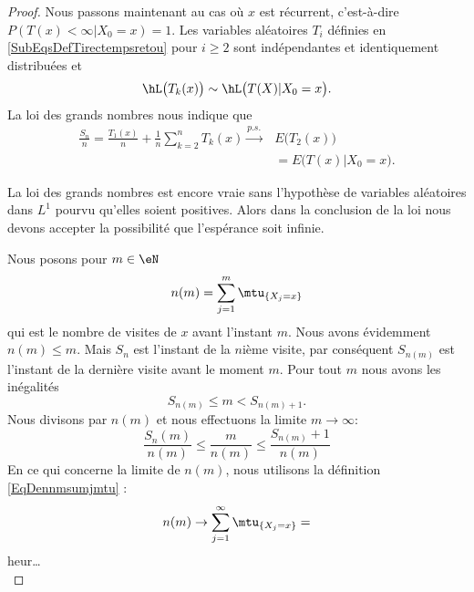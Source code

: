 \begin{proof}
	Nous passons maintenant au cas où \( x\) est récurrent, c'est-à-dire \( P(T(x)<\infty|X_0=x)=1\). Les variables aléatoires \( T_i\) définies en \eqref{SubEqsDefTirectempsretou} pour \( i\geq 2\) sont indépendantes et identiquement distribuées et
	\begin{equation}
		\hL\big( T_k(x) \big)\sim\hL\big( T(X)|X_0=x \big).
	\end{equation}
	La loi des grands nombres nous indique que
	\begin{subequations}        \label{EqlgnMarkdemked}
		\begin{align}
			\frac{ S_n }{ n }=\frac{ T_1(x) }{ n }+\frac{1}{ n }\sum_{k=2}^nT_k(x)\stackrel{p.s.}{\longrightarrow} & E\big( T_2(x) \big)       \\
			                                                                                                       & =E\big( T(x)|X_0=x \big).
		\end{align}
	\end{subequations}
	\begin{remark}
		La loi des grands nombres est encore vraie sans l'hypothèse de variables aléatoires dans \( L^1\) pourvu qu'elles soient positives. Alors dans la conclusion de la loi nous devons accepter la possibilité que l'espérance soit infinie.
	\end{remark}
	Nous posons pour \( m\in\eN\)
	\begin{equation}    \label{EqDennmsumjmtu}
		n(m)=\sum_{j=1}^m\mtu_{\{ X_j=x \}}
	\end{equation}
	qui est le nombre de visites de \( x\) avant l'instant \( m\). Nous avons évidemment \( n(m)\leq m\). Mais \( S_n\) est l'instant de la \( n\)ième visite, par conséquent \( S_{n(m)}\) est l'instant de la dernière visite avant le moment \( m\). Pour tout \( m\) nous avons les inégalités
	\begin{equation}
		S_{n(m)}\leq m<S_{n(m)+1}.
	\end{equation}
	Nous divisons par \( n(m)\) et nous effectuons la limite \( m\to\infty\):
	\begin{equation}    \label{EqdrembSnm}
		\frac{ S_n(m) }{ n(m) }\leq \frac{ m }{ n(m) }\leq\frac{ S_{n(m)}+1 }{ n(m) }
	\end{equation}
	En ce qui concerne la limite de \( n(m)\), nous utilisons la définition \eqref{EqDennmsumjmtu} :
	\begin{equation}
		n(m)\to\sum_{j=1}^{\infty}\mtu_{\{ X_j=x \}}=
	\end{equation}
	heur\ldots
	\begin{equation}

\end{equation}
\end{proof}
